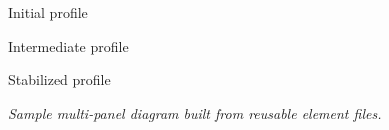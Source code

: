 \begin{center}
    \begin{minipage}[t]{0.31\linewidth}
        \centering
        

        \small Initial profile
    \end{minipage}\hfill
    \begin{minipage}[t]{0.31\linewidth}
        \centering
        

        \small Intermediate profile
    \end{minipage}\hfill
    \begin{minipage}[t]{0.31\linewidth}
        \centering
        

        \small Stabilized profile
    \end{minipage}

    \medskip
    \textit{Sample multi-panel diagram built from reusable element files.}
\end{center}
